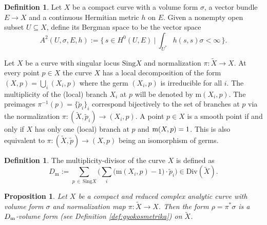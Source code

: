 \documentclass[11pt]{amsart}
\newtheorem{prop}[theorem]{Proposition}
\theoremstyle{definition}
\newtheorem{definition}[theorem]{Definition}
\newcommand{\ra}{\rightarrow}
\begin{document}
\begin{definition}\label{def:singberg}
    Let $X$ be a compact curve with a volume form $\sigma$, a vector bundle $E\ra X$ and a continuous Hermitian metric $h$ on $E$. Given a nonempty  open subset $U \subseteq X$, define its Bergman space to be the vector space
    $$A^2(U,\sigma,E,h) := \Big\{ \, s \in H^0(U,E)  \ \Big| \ \int_{U^*} h(s,s)\sigma < \infty \, \Big\}.$$
\end{definition}

\noindent Let $X$ be a curve with singular locus $\text{Sing}X$ and normalization $\pi : \widetilde{X} \to X$. At every point $p\in X$ the curve $X$ has a local decomposition of the form $(X,p) = \bigcup_i(X_i,p)$ where the germ $(X_i,p)$ is irreducible for all $i$. The multiplicity of the (local) branch $X_i$ at $p$ will be denoted by $\text{m}(X_i,p)$. The preimages $\pi^{-1}(p) = \{\tilde{p}_i\}_i$ correspond bijectively to the set of branches at $p$ via the normalization $\pi:(\widetilde{X},\tilde{p}_i) \to (X_i,p)$. A point $p \in X$ is a smooth point if and only if $X$ has only one (local) branch at $p$ and ${\rm m}(X,p) = 1$. This is also equivalent to $\pi: (\widetilde{X},\tilde{p}) \to (X,p)$ being an isomorphism of germs.

\begin{definition}\label{def:multdiv}
   The multiplicity-divisor of the curve $X$ is defined as
   $$D_\text{m} := \sum_{p\, \in\, \text{Sing}X} \Big( \sum_i \big( \text{m}(X_i,p)-1\big)\cdot \tilde{p}_i \Big) \in \text{Div}(\widetilde{X}).$$
\end{definition}

\begin{prop} \label{prop:projDmvol}
    Let $X$ be a compact and reduced complex analytic curve with volume form $\sigma$ and normalization map $\pi : \widetilde{X} \to X$. Then the form $\rho = \pi^*\sigma$ is a $D_\text{\normalfont m}$-volume form (see Definition \ref{def:gyokosmetrika}) on $\widetilde{X}$.
\end{prop}
\end{document}
